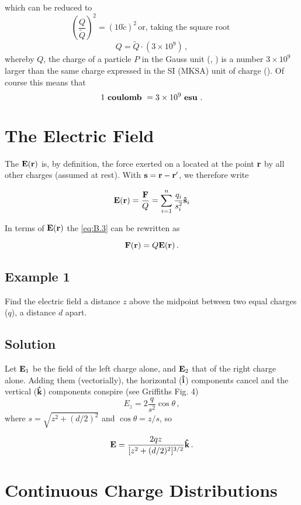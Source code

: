 which can be reduced to $$\left( \frac{Q}{\tilde{Q}} \right)^2 = (10 \tilde{c})^2\,\text{or, taking the square root }$$
$$Q = \tilde{Q} \cdot (3 \times 10^9)\,,$$
whereby $Q$, the charge of a particle $P$ in the Gauss unit (,  ) is a number $3 \times 10^9$ larger than the same charge expressed in the SI (MKSA) unit of charge (). Of course this means that 
$$1 \text{ \textbf{coulomb} } = 3 \times 10^9 \text{ \textbf{esu} .} $$

\section{The Electric Field}\label{sec:1.3}
The  $\vb{E}(\vb{r})$ is, by definition, the force exerted on a  located at the point $\vb{r}$ by all other charges (assumed at rest). With $\vb{s} = \vb{r} - \vb{r}'$, we therefore write

\begin{equation}
\label{eq:B.5}
\vb{E}(\vb{r}) = \frac{\vb{F}}{Q} =  \sum_{i=1}^n \frac{q_i}{s_i^2} \vu{s}_i
\end{equation}

In terms of $\vb{E}(\vb{r})$ the  \ref{eq:B.3} can be rewritten as 

\begin{equation}
\label{eq:B.6}
\vb{F}(\vb{r}) = Q \vb{E}(\vb{r})\,.
\end{equation}


\subsection*{Example 1}
Find the electric field a distance $z$ above the midpoint between two equal charges ($q$), a distance $d$ apart.

\subsection*{Solution}
Let $\vb{E}_1$ be the field of the left charge alone, and $\vb{E}_2$ that of the right charge alone. Adding them (vectorially), the horizontal ($\vu{i}$) components cancel and the vertical ($\vu{k}$) components conspire (see Griffiths Fig. 4)
$$E_z = 2 \frac{q}{s^2} \cos \theta\,,$$ where $s = \sqrt{z^2 + (d/2)^2}$  and $\cos \theta = z / s$, so

$$ \vb{E} = \frac{2 q z}{[z^2 + (d/2)^2]^{3/2}} \vu{k}\,.$$ 


\section{Continuous Charge Distributions}\label{sec:1.4}


